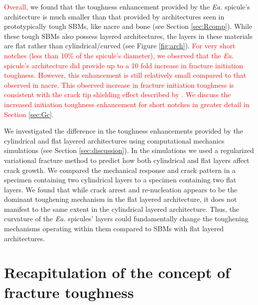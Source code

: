 \documentclass[12pt,onecolumn]{article}
\makeatletter
\newcommand{\EA}{\textit{Ea.\@}\xspace}
\makeatother
\begin{document}
\begin{bibunit}
\textcolor{red}{Overall,} we found that the toughness enhancement provided by the \EA spicule's architecture is much smaller than that provided by architectures seen in prototypically tough SBMs, like nacre and bone (see Section \ref{sec:Rcomp}). While these tough SBMs also possess layered architectures, the layers in these materials are flat rather than cylindrical/curved (see Figure \ref{fig:arch}). \textcolor{red}{For very short notches (less than 10\% of the spicule's diameter), we observed that the \EA spicule's architecture did provide up to a 10 fold increase in fracture initiation toughness. However, this enhancement is still relatively small compared to that observed in nacre. This observed increase in fracture initiation toughness is consistent with the crack tip shielding effect described by \cite{kolednik2014improvements}. We discuss the increased initiation toughness enhancement for short notches in greater detail in Section \ref{sec:Gc}.}

We investigated the difference in the toughness enhancements provided by the cylindrical and flat layered architectures using computational mechanics simulations (see Section \ref{sec:discussion}). In the simulations we used a regularized variational fracture method \cite{bourdin2000numerical} to predict how both cylindrical and flat layers affect crack growth. We compared the mechanical response and crack pattern in a specimen containing two cylindrical layers to a specimen containing two flat layers. We found that while crack arrest and re-nucleation appears to be the dominant toughening mechanism in the flat layered architecture, it does not manifest to the same extent in the cylindrical layered architecture. Thus, the curvature of the \EA spicules' layers could fundamentally change the toughening mechanisms operating within them compared to SBMs with flat layered architectures.

\section{Recapitulation of the concept of fracture toughness}
\label{sec:tdef}


\end{bibunit}
\end{document}
